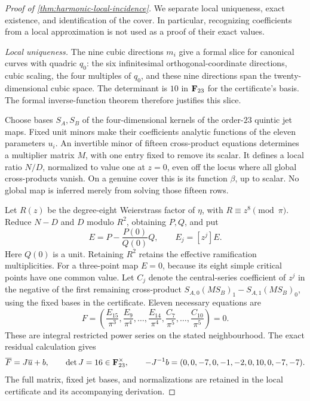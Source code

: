 \begin{proof}[Proof of \cref{thm:harmonic-local-incidence}]
We separate local uniqueness, exact existence, and identification of
the cover.  In particular, recognizing coefficients from a local
approximation is not used as a proof of their exact values.

\emph{Local uniqueness.}
The nine cubic directions $m_i$ give a formal slice for canonical
curves with quadric $q_0$: the six infinitesimal orthogonal-coordinate
directions, cubic scaling, the four multiples of $q_0$, and these
nine directions span the twenty-dimensional cubic space.
The determinant is $10$ in $\mathbf F_{23}$ for the certificate's basis.
The formal inverse-function theorem therefore justifies this slice.

Choose bases $S_A,S_B$ of the four-dimensional kernels of the
order-$23$ quintic jet maps.  Fixed unit minors make their
coefficients analytic functions of the eleven parameters $u_i$.
An invertible minor of fifteen cross-product equations determines
a multiplier matrix $M$, with one entry fixed to remove its scalar.
It defines a local ratio $N/D$, normalized to value one at $z=0$,
even off the locus where all global cross-products vanish.
On a genuine cover this is its function $\beta$, up to scalar.
No global map is inferred merely from solving those fifteen rows.

Let $R(z)$ be the degree-eight Weierstrass factor of $\eta$, with
$R\equiv z^8\pmod\pi$.  Reduce $N-D$ and $D$ modulo $R^2$, obtaining
$P,Q$, and put
\[
 E=P-\frac{P(0)}{Q(0)}Q,\qquad E_j=[z^j]E.
\]
Here $Q(0)$ is a unit.  Retaining $R^2$ retains the effective
ramification multiplicities.  For a three-point map $E=0$,
because its eight simple critical points have one common value.
Let $C_j$ denote the central-series coefficient of $z^j$ in the
negative of the first remaining cross-product
$S_{A,0}(MS_B)_1-S_{A,1}(MS_B)_0$, using the fixed bases in the
certificate.  Eleven necessary equations are
\begin{equation}\label{eq:harmonic-hensel-equations}
 F=\left(\frac{E_{15}}{\pi^3},
       \frac{E_9}{\pi^4},\ldots,\frac{E_{14}}{\pi^4},
       \frac{C_7}{\pi^5},\ldots,\frac{C_{10}}{\pi^5}\right)=0.
\end{equation}
These are integral restricted power series on the stated neighbourhood.
The exact residual calculation gives
\[
 \overline F=J\overline u+b,\qquad
 \det J=16\in\mathbf F_{23}^{\times},\qquad
 -J^{-1}b=(0,0,-7,0,-1,-2,0,10,0,-7,-7).
\]
The full matrix, fixed jet bases, and normalizations are retained in
the local certificate and its accompanying derivation.


\end{proof}
